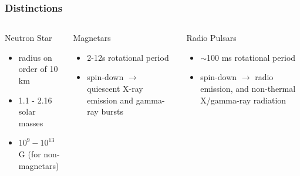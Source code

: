 \documentclass[hyperref=pdftex, presentation]{beamer}
\begin{document}

\begin{frame}{}
\frametitle{\Large Distinctions}
\begin{columns}[c] %

\begin{block}{Neutron Star}
\begin{itemize}
 \item radius on order of 10 km%
 \item 1.1 - 2.16 solar masses
 \item $10^9-10^{13}$ G (for non-magnetars)
\end{itemize}
\end{block}
\begin{block}{Magnetars}
\begin{itemize}
 \item<2-> 2-12s rotational period%
 \item<4-> spin-down $\rightarrow$ quiescent X-ray emission and gamma-ray bursts
\end{itemize}
\end{block}
\begin{block}{Radio Pulsars}
\begin{itemize}
	\item<3-> $\sim$100 ms rotational period%
	\item<5-> spin-down $\rightarrow$ radio emission, and non-thermal X/gamma-ray radiation
\end{itemize}
\end{block}


\end{columns}
\end{frame}




\end{document}
